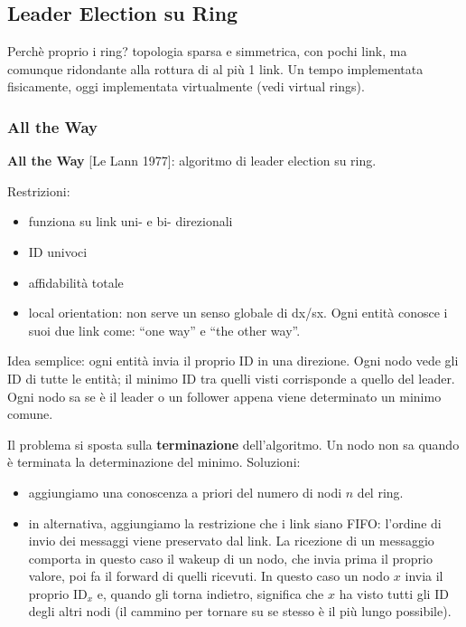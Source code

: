 \subsection{Leader Election su Ring}

Perchè proprio i ring? topologia sparsa e simmetrica, con pochi link, ma comunque ridondante alla rottura di al più 1 link.
Un tempo implementata fisicamente, oggi implementata virtualmente (vedi virtual rings).

\subsubsection{All the Way}
\textbf{All the Way} [Le Lann 1977]: algoritmo di leader election su ring.

Restrizioni:
\begin{itemize}
  \item funziona su link uni- e bi- direzionali
  \item ID univoci
  \item affidabilità totale
  \item local orientation: non serve un senso globale di dx/sx. Ogni entità conosce i suoi due link come: ``one way'' e ``the other way''.
\end{itemize}

Idea semplice: ogni entità invia il proprio ID in una direzione. Ogni nodo vede gli ID di tutte le entità; il minimo ID tra quelli visti
corrisponde a quello del leader. Ogni nodo sa se è il leader o un follower appena viene determinato un minimo comune.

Il problema si sposta sulla \textbf{terminazione} dell'algoritmo. Un nodo non sa quando è terminata la determinazione del minimo.
Soluzioni:
\begin{itemize}
 \item aggiungiamo una conoscenza a priori del numero di nodi $n$ del ring.
 \item in alternativa, aggiungiamo la restrizione che i link siano FIFO: l'ordine di invio dei messaggi viene preservato dal link.
 La ricezione di un messaggio comporta in questo caso il wakeup di un nodo, che invia prima il proprio valore, poi fa il forward di quelli ricevuti.
  In questo caso un nodo $x$ invia il proprio $\text{ID}_x$ e, quando gli torna indietro, significa
  che $x$ ha visto tutti gli ID degli altri nodi (il cammino per tornare su se stesso è il più lungo possibile).
\end{itemize}


